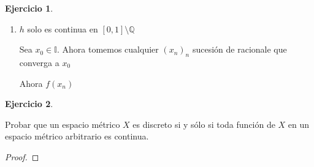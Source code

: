 \documentclass[11pt]{report}
\newcommand{\Q}{\mathbb{Q}}
\newcommand{\I}{\mathbb{I}}
\theoremstyle{definition}
\newtheorem{ej}{Ejercicio}
\begin{document}
\begin{ej}
\begin{enumerate}
\begin{proof}
					Tenemos que $g(x_n) = 0 $ por lo tanto $f(x_n)$ converge a $0$ pero $g(x) = x \neq 0$

					Entonces $g(x_n)$ no converge a $g(x)$, por lo tanto $g$ no es continua en $\Q \setminus \{0\}$

					Hacemos lo mismo con un $x_0 \in \I$ , hay una sucesión de racional convergiendo a él, cuando le aplicamos $g$ nos queda constantemente 1, por lo tanto converge a 1 , pero $g(x_0) = 0$

					Entonces $g(x_n)$ no converge a $g(x_0)$, por lo tanto $g$ no es continua en $\I \setminus \{0\}$

					Entonce $g $ es continua únicamente en el 0

				\end{proof}
				
			\item $h$ solo es continua en $[0,1] \setminus \Q$
				
				Sea $x_0 \in \I$. Ahora tomemos cualquier $(x_n)_n $ sucesión de racionale que converga a $x_0$

				Ahora $f(x_n)$
		\end{enumerate}



		\end{ej}
	\begin{ej}
		
	\end{ej}
		Probar que un espacio métrico $X$ es discreto si y sólo si toda función de $X$ en un espacio métrico arbitrario es continua.

		\begin{proof}
			
		\end{proof}
		
		
	
\end{document}
